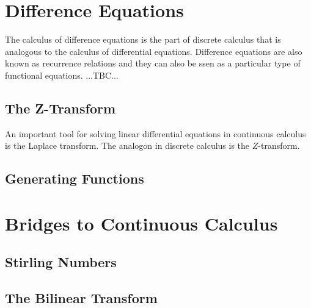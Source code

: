 \section{Difference Equations}
The calculus of difference equations is the part of discrete calculus that is analogous to the calculus of differential equations. Difference equations are also known as recurrence relations and they can also be ssen as a particular type of functional equations. ...TBC...


\subsection{The Z-Transform}
An important tool for solving linear differential equations in continuous calculus is the Laplace transform. The analogon in discrete calculus is the $Z$-transform.






\subsection{Generating Functions}




\section{Bridges to Continuous Calculus}


\subsection{Stirling Numbers}



\subsection{The Bilinear Transform}

